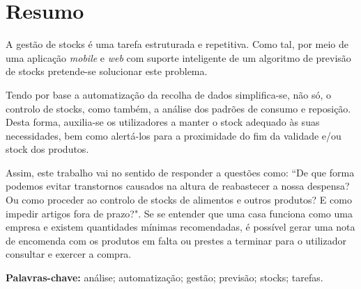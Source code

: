\cleardoublepage\newpage
\chapter*{Resumo} \label{resumo}

A gestão de stocks é uma tarefa estruturada e repetitiva. Como tal, por meio de uma aplicação \textit{mobile} e \textit{web} com suporte inteligente de um algoritmo de previsão de stocks pretende-se solucionar este problema.

Tendo por base a automatização da recolha de dados simplifica-se, não só, o controlo de stocks, como também, a análise dos padrões de consumo e reposição.
Desta forma, auxilia-se os utilizadores a manter o stock adequado às suas necessidades, bem como alertá-los para a proximidade do fim da validade e/ou stock dos produtos. 

Assim, este trabalho vai no sentido de responder a questões como: ``De que forma podemos evitar transtornos causados na altura de reabastecer a nossa despensa? Ou como proceder ao controlo de stocks de alimentos e outros produtos? E como impedir artigos fora de prazo?". Se se entender que uma casa funciona como uma empresa e existem quantidades mínimas recomendadas, é possível gerar uma nota de encomenda com os produtos em falta ou prestes a terminar para o utilizador consultar e exercer a compra.

\vspace{0.2cm}
{\bf Palavras-chave:} análise; automatização; gestão; previsão; stocks; tarefas.